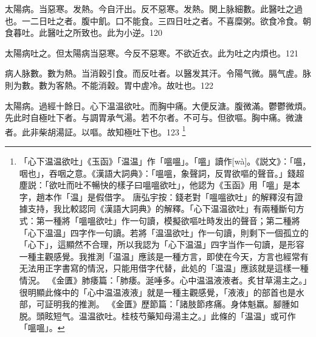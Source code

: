 %
%
%	
%
%
%
%
%
%
%
%

太陽病。当惡寒。发熱。今自汗出。反不惡寒。发熱。関上脉細數。此醫吐之過也。一二日吐之者。腹中飢。口不能食。三四日吐之者。不喜糜粥。欲食冷食。朝食暮吐。此醫吐之所致也。此为小逆。120

太陽病吐之。但太陽病当惡寒。今反不惡寒。不欲近衣。此为吐之内煩也。121

病人脉數。數为熱。当消穀引食。而反吐者。以醫发其汗。令陽气微。膈气虗。脉則为數。數为客熱。不能消穀。胃中虗冷。故吐也。122

太陽病。過經十餘日。心下温温欲吐。而胸中痛。大便反溏。腹微滿。鬱鬱微煩。先{\khaaitp 此}时自極吐下者。与{\khaaitp 調胃}承气湯。若不尔者。不可与。但欲嘔。胸中痛。微溏者。此非柴胡湯証。以嘔。故知極吐下也。123
	\footnote{
		「心下温温欲吐」《玉函》「温温」作「嗢嗢」。「嗢」讀作[wà]。《説文》：「嗢，咽也」，吞咽之意。《漢語大詞典》：「嗢嗢，象聲詞，反胃欲嘔的聲音。」錢超塵説：「欲吐而吐不暢快的樣子曰嗢嗢欲吐」，他認为《玉函》用「嗢」是本字，趙本作「温」是假借字。
		唐弘宇按：錢老對「嗢嗢欲吐」的解釋沒有證據支持，我比較認同《漢語大詞典》的解釋。「心下温温欲吐」有兩種斷句方式：第一種將「嗢嗢欲吐」作一句讀，模擬欲嘔吐時发出的聲音；第二種將「心下温温」四字作一句讀。若將「温温欲吐」作一句讀，則剩下一個孤立的「心下」，這顯然不合理，所以我認为「心下温温」四字当作一句讀，是形容一種主觀感覺。我推測「温温」應該是一種方言，即使在今天，方言也經常有无法用正字書寫的情況，只能用借字代替，此処的「温温」應該就是這樣一種情況。
		《金匱》肺痿篇：「肺痿。涎唾多。心中温温液液者。炙甘草湯主之。」很明顯此條中的「心中温温液液」就是一種主觀感覺，「液液」的部首也是水部，可証明我的推測。
		《金匱》歷節篇：「諸肢節疼痛。身体魁羸。腳腫如脱。頭眩短气。温温欲吐。桂枝芍藥知母湯主之。」此條的「温温」或可作「嗢嗢」。
	}

